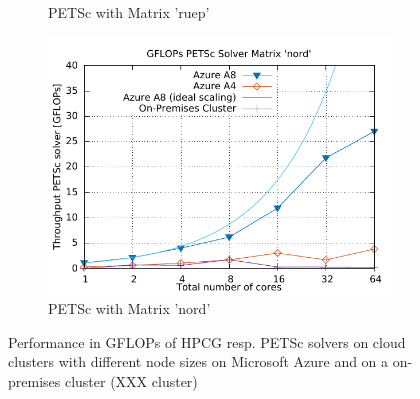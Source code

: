 \documentclass[3p,times]{elsarticle}
\begin{document}
\begin{figure}[h]
\begin{subfigure}{.33\textwidth}
	\caption{PETSc with Matrix 'ruep'}
  \label{fig:ruep}
\end{subfigure}%
\begin{subfigure}{.33\textwidth}
  \centering
  \includegraphics[width=\linewidth]{gplt-gflops-nord}
	\caption{PETSc with Matrix 'nord'}
  \label{fig:nord}
\end{subfigure}

\caption{Performance in GFLOPs of HPCG resp. PETSc solvers on cloud clusters with different node sizes on Microsoft Azure and on a on-premises cluster (XXX cluster) }
\label{fig:test}
\end{figure}
\end{document}
